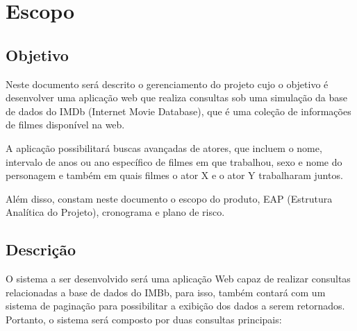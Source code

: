 \documentclass[
	12pt,				%
	oneside,			%
	a4paper,			%
	brazil				%
	]{abntex2}
\begin{document}





\tableofcontents*
\cleardoublepage



\textual





\chapter{Escopo}
\section{Objetivo}
	Neste documento será descrito o gerenciamento do projeto cujo o objetivo é desenvolver uma aplicação web que realiza consultas sob uma simulação da base de dados do IMDb (Internet Movie Database), que é uma coleção de informações de filmes disponível na web.
    
    
   A aplicação possibilitará buscas avançadas de atores, que incluem o nome, intervalo de anos ou ano específico de filmes em que trabalhou, sexo e nome do personagem e também em quais filmes o ator X e o ator Y trabalharam juntos. 
   
   
   Além disso, constam neste documento o escopo do produto, EAP (Estrutura Analítica do Projeto), cronograma e plano de risco. 
   
\section{Descrição}
O sistema a ser desenvolvido será uma aplicação Web capaz de realizar consultas relacionadas a base de dados do IMBb, para isso, também contará com um sistema de paginação para possibilitar a exibição dos dados a serem retornados. Portanto, o sistema será composto por duas consultas principais:
 
\end{document}
